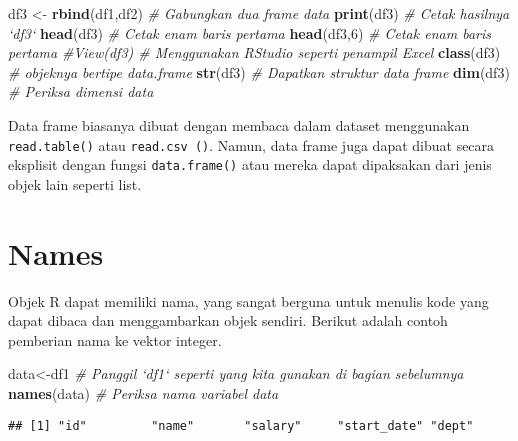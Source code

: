 \documentclass[
]{book}
\newenvironment{Shaded}{\begin{snugshade}}{\end{snugshade}}
\newcommand{\CommentTok}[1]{\textcolor[rgb]{0.56,0.35,0.01}{\textit{#1}}}
\newcommand{\DecValTok}[1]{\textcolor[rgb]{0.00,0.00,0.81}{#1}}
\newcommand{\KeywordTok}[1]{\textcolor[rgb]{0.13,0.29,0.53}{\textbf{#1}}}
\newcommand{\NormalTok}[1]{#1}
\newcommand{\StringTok}[1]{\textcolor[rgb]{0.31,0.60,0.02}{#1}}
\begin{document}
\begin{Shaded}
\begin{Highlighting}[]
\NormalTok{df3 <-}\StringTok{ }\KeywordTok{rbind}\NormalTok{(df1,df2)                  }\CommentTok{# Gabungkan dua frame data}
\KeywordTok{print}\NormalTok{(df3)                             }\CommentTok{# Cetak hasilnya `df3`}
\KeywordTok{head}\NormalTok{(df3)                              }\CommentTok{# Cetak enam baris pertama}
\KeywordTok{head}\NormalTok{(df3,}\DecValTok{6}\NormalTok{)                            }\CommentTok{# Cetak enam baris pertama}
\CommentTok{#View(df3)                             # Menggunakan RStudio seperti penampil Excel}
\KeywordTok{class}\NormalTok{(df3)                             }\CommentTok{# objeknya bertipe data.frame}
\KeywordTok{str}\NormalTok{(df3)                               }\CommentTok{# Dapatkan struktur data frame}
\KeywordTok{dim}\NormalTok{(df3)                               }\CommentTok{# Periksa dimensi data}
\end{Highlighting}
\end{Shaded}

Data frame biasanya dibuat dengan membaca dalam dataset menggunakan \texttt{read.table()} atau \texttt{read.csv\ ()}. Namun, data frame juga dapat dibuat secara eksplisit dengan fungsi \texttt{data.frame()} atau mereka dapat dipaksakan dari jenis objek lain seperti list.

\hypertarget{names}{%
\section{Names}\label{names}}

Objek R dapat memiliki nama, yang sangat berguna untuk menulis kode yang dapat dibaca dan menggambarkan objek sendiri. Berikut adalah contoh pemberian nama ke vektor integer.

\begin{Shaded}
\begin{Highlighting}[]
\NormalTok{data<-df1                              }\CommentTok{# Panggil `df1` seperti yang kita gunakan di bagian sebelumnya}
\KeywordTok{names}\NormalTok{(data)                            }\CommentTok{# Periksa nama variabel data}
\end{Highlighting}
\end{Shaded}

\begin{verbatim}
## [1] "id"         "name"       "salary"     "start_date" "dept"
\end{verbatim}
\end{document}
